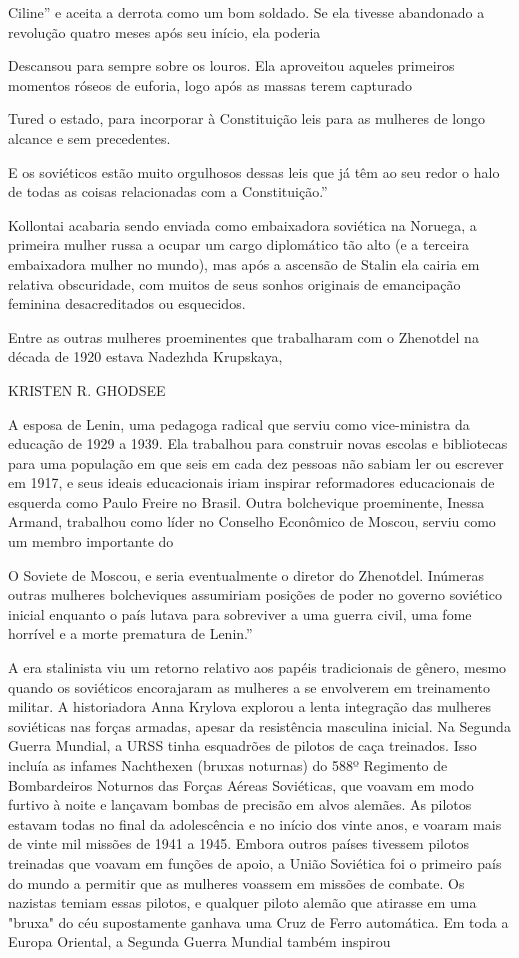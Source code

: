  \par 
Ciline” e aceita a derrota como um bom soldado. Se ela tivesse abandonado a revolução quatro meses após seu início, ela poderia
 \par 
Descansou para sempre sobre os louros. Ela aproveitou aqueles primeiros momentos róseos de euforia, logo após as massas terem capturado
 \par 
Tured o estado, para incorporar à Constituição leis para as mulheres de longo alcance e sem precedentes.
 \par 
E os soviéticos estão muito orgulhosos dessas leis que já têm ao seu redor o halo de todas as coisas relacionadas com a Constituição.”
 \par 
Kollontai acabaria sendo enviada como embaixadora soviética na Noruega, a primeira mulher russa a ocupar um cargo diplomático tão alto (e a terceira embaixadora mulher no mundo), mas após a ascensão de Stalin ela cairia em relativa obscuridade, com muitos de seus sonhos originais de emancipação feminina desacreditados ou esquecidos.
 \par 
Entre as outras mulheres proeminentes que trabalharam com o Zhenotdel na década de 1920 estava Nadezhda Krupskaya,
 \par 
KRISTEN R. GHODSEE
 \par 
A esposa de Lenin, uma pedagoga radical que serviu como vice-ministra da educação de 1929 a 1939. Ela trabalhou para construir novas escolas e bibliotecas para uma população em que seis em cada dez pessoas não sabiam ler ou escrever em 1917, e seus ideais educacionais iriam inspirar reformadores educacionais de esquerda como Paulo Freire no Brasil. Outra bolchevique proeminente, Inessa Armand, trabalhou como líder no Conselho Econômico de Moscou, serviu como um membro importante do
 \par 
O Soviete de Moscou, e seria eventualmente o diretor do Zhenotdel. Inúmeras outras mulheres bolcheviques assumiriam posições de poder no governo soviético inicial enquanto o país lutava para sobreviver a uma guerra civil, uma fome horrível e a morte prematura de Lenin.”
 \par 
A era stalinista viu um retorno relativo aos papéis tradicionais de gênero, mesmo quando os soviéticos encorajaram as mulheres a se envolverem em treinamento militar. A historiadora Anna Krylova explorou a lenta integração das mulheres soviéticas nas forças armadas, apesar da resistência masculina inicial. Na Segunda Guerra Mundial, a URSS tinha esquadrões de pilotos de caça treinados. Isso incluía as infames Nachthexen (bruxas noturnas) do 588º Regimento de Bombardeiros Noturnos das Forças Aéreas Soviéticas, que voavam em modo furtivo à noite e lançavam bombas de precisão em alvos alemães. As pilotos estavam todas no final da adolescência e no início dos vinte anos, e voaram mais de vinte mil missões de 1941 a 1945. Embora outros países tivessem pilotos treinadas que voavam em funções de apoio, a União Soviética foi o primeiro país do mundo a permitir que as mulheres voassem em missões de combate. Os nazistas temiam essas pilotos, e qualquer piloto alemão que atirasse em uma "bruxa" do céu supostamente ganhava uma Cruz de Ferro automática. Em toda a Europa Oriental, a Segunda Guerra Mundial também inspirou
